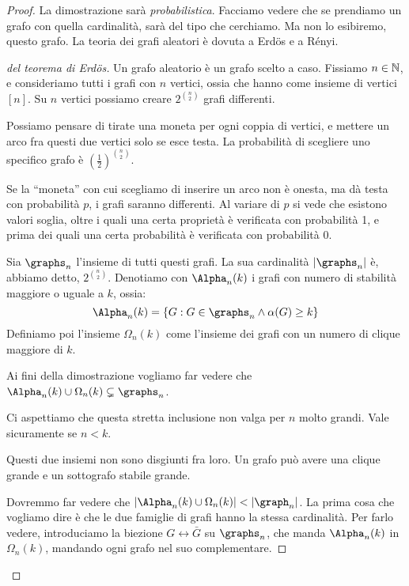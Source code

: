 \begin{proof}
	La dimostrazione sar\`a \emph{probabilistica}.
	Facciamo vedere che se prendiamo un grafo con quella cardinalit\`a, sar\`a del tipo che cerchiamo.
	Ma non lo esibiremo, questo grafo.
	La teoria dei grafi aleatori \`e dovuta a Erd\"os e a R\'enyi.

	\begin{proof}[del teorema di Erd\"os]
		Un grafo aleatorio \`e un grafo scelto a caso.
		Fissiamo $n \in \mathbb{N}$, e consideriamo tutti i grafi con $n$ vertici, ossia che hanno come insieme di vertici $[n]$.
		Su $n$ vertici possiamo creare $2^{\binom{n}{2}}$ grafi differenti.

		Possiamo pensare di tirate una moneta per ogni coppia di vertici, e mettere un arco fra questi due vertici solo se esce testa.
		La probabilit\`a di scegliere uno specifico grafo \`e ${\left( \frac{1}{2} \right)}^{\binom{n}{2}}$.

		Se la ``moneta'' con cui scegliamo di inserire un arco non \`e onesta, ma d\`a testa con probabilit\`a $p$, i grafi saranno differenti.
		Al variare di $p$ si vede che esistono valori soglia, oltre i quali una certa propriet\`a \`e verificata con probabilit\`a 1, e prima dei quali una certa probabilit\`a \`e verificata con probabilit\`a 0.

		Sia $\graphs_n$ l'insieme di tutti questi grafi.
		La sua cardinalit\`a $\abs{\graphs_n}$ \`e, abbiamo detto, $2^{\binom{n}{2}}$.
		Denotiamo con $\Alpha_n(k)$ i grafi con numero di stabilit\`a maggiore o uguale a $k$, ossia:
		\[
			\Alpha_n(k) = \{ G : G \in \graphs_n \land \alpha(G) \ge k \}
		\]
		Definiamo poi l'insieme $\Omega_n (k)$ come l'insieme dei grafi con un numero di clique maggiore di $k$.

		Ai fini della dimostrazione vogliamo far vedere che $\Alpha_n (k) \cup \Omega_n (k) \subsetneq \graphs_n$.

		Ci aspettiamo che questa stretta inclusione non valga per $n$ molto grandi.
		Vale sicuramente se $n < k$. %

		Questi due insiemi non sono disgiunti fra loro.
		Un grafo pu\`o avere una clique grande e un sottografo stabile grande.

		Dovremmo far vedere che $\abs{\Alpha_n (k) \cup \Omega_n (k)} < \abs{\graph_n}$.
		La prima cosa che vogliamo dire \`e che le due famiglie di grafi hanno la stessa cardinalit\`a.
		Per farlo vedere, introduciamo la biezione $G \leftrightarrow \bar{G}$ su $\graphs_n$, che manda $\Alpha_n (k)$ in $\Omega_n (k)$, mandando ogni grafo nel suo complementare.


\end{proof}
\end{proof}
